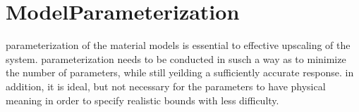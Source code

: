 \section{ModelParameterization}
parameterization of the material models is essential to effective upscaling of the system. parameterization needs to be conducted in susch a way as to minimize the number of parameters, while still yeilding a sufficiently accurate response. in addition, it is ideal, but not necessary for the parameters to have physical meaning in order to specify realistic bounds with less difficulty.




